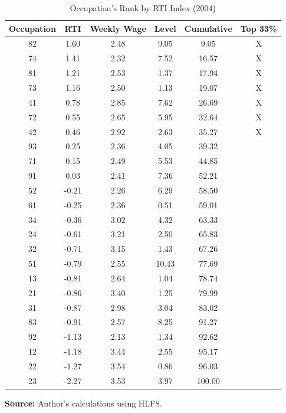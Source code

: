 \begin{table}[H]
\caption{\label{tab:Occupation's-Rank-by-RTI}Occupation's Rank by RTI Index
(2004)}

\begin{centering}
\begin{tabular}{cccccc}
\toprule 
Occupation & RTI & Weekly Wage & Level & Cumulative & Top 33\%\tabularnewline
\midrule 
82 & 1.60 & 2.48 & 9.05 & 9.05 & X\tabularnewline
74 & 1.41 & 2.32 & 7.52 & 16.57 & X\tabularnewline
81 & 1.21 & 2.53 & 1.37 & 17.94 & X\tabularnewline
73 & 1.16 & 2.50 & 1.13 & 19.07 & X\tabularnewline
41 & 0.78 & 2.85 & 7.62 & 26.69 & X\tabularnewline
72 & 0.55 & 2.65 & 5.95 & 32.64 & X\tabularnewline
42 & 0.46 & 2.92 & 2.63 & 35.27 & X\tabularnewline
93 & 0.25 & 2.36 & 4.05 & 39.32 & \tabularnewline
71 & 0.15 & 2.49 & 5.53 & 44.85 & \tabularnewline
91 & 0.03 & 2.41 & 7.36 & 52.21 & \tabularnewline
52 & -0.21 & 2.26 & 6.29 & 58.50 & \tabularnewline
61 & -0.25 & 2.36 & 0.51 & 59.01 & \tabularnewline
34 & -0.36 & 3.02 & 4.32 & 63.33 & \tabularnewline
24 & -0.61 & 3.21 & 2.50 & 65.83 & \tabularnewline
32 & -0.71 & 3.15 & 1.43 & 67.26 & \tabularnewline
51 & -0.79 & 2.55 & 10.43 & 77.69 & \tabularnewline
13 & -0.81 & 2.64 & 1.04 & 78.74 & \tabularnewline
21 & -0.86 & 3.40 & 1.25 & 79.99 & \tabularnewline
31 & -0.87 & 2.98 & 3.04 & 83.02 & \tabularnewline
83 & -0.91 & 2.57 & 8.25 & 91.27 & \tabularnewline
92 & -1.13 & 2.13 & 1.34 & 92.62 & \tabularnewline
12 & -1.18 & 3.44 & 2.55 & 95.17 & \tabularnewline
22 & -1.27 & 3.54 & 0.86 & 96.03 & \tabularnewline
23 & -2.27 & 3.53 & 3.97 & 100.00 & \tabularnewline
\bottomrule
\end{tabular}
\par\end{centering}
\medskip

\textbf{Source: }Author's calculations using HLFS.
\end{table}
